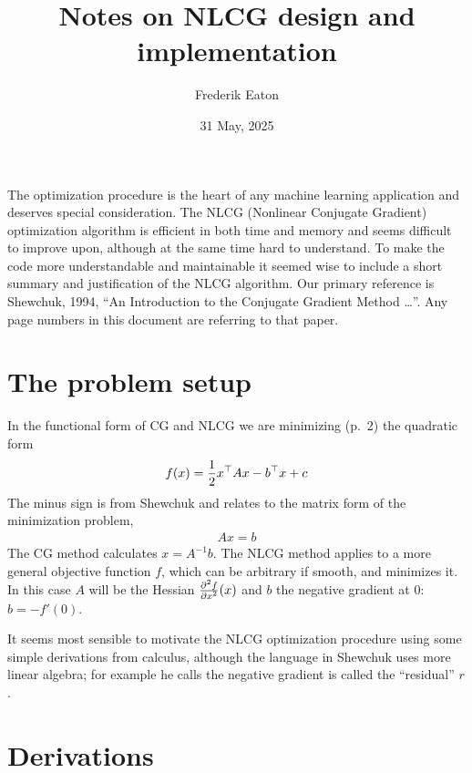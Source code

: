 \documentclass[11pt]{article}
\author{Frederik Eaton}
\date{31 May, 2025}
\title{Notes on NLCG design and implementation}
\newcommand{\T}{\top}
\renewcommand{\(}{\left(}
\renewcommand{\)}{\right)}
\newcommand{\partbyt}[2]{{\partial^2 #1\over {\partial #2}^2}}
\begin{document}
\maketitle

The optimization procedure is the heart of any machine learning
application and deserves special consideration. The NLCG (Nonlinear
Conjugate Gradient) optimization algorithm is efficient in both time
and memory and seems difficult to improve upon, although at the same
time hard to understand. To make the code more understandable and
maintainable it seemed wise to include a short summary and
justification of the NLCG algorithm. Our primary reference is
Shewchuk, 1994, ``An Introduction to the Conjugate Gradient Method
\ldots''. Any page numbers in this document are referring to that
paper.

\tableofcontents

\section{The problem setup}

In the functional form of CG and NLCG we are minimizing (p.~2) the
quadratic form
\begin{align}
f(x) = {1\over 2} x^\T A x - b^\T x + c
\end{align}
The minus sign is from Shewchuk and relates to the matrix form of the
minimization problem,
\begin{align}
Ax=b
\end{align}
The CG method calculates $x=A^{-1} b$. The NLCG method applies to a
more general objective function $f$, which can be arbitrary if smooth,
and minimizes it. In this case $A$ will be the Hessian
$\partbyt{f}{x}(x)$ and $b$ the negative gradient at 0: $b=-f'(0)$.

It seems most sensible to motivate the NLCG optimization procedure
using some simple derivations from calculus, although the language in
Shewchuk uses more linear algebra; for example he calls the negative
gradient is called the ``residual'' $r$.

\section{Derivations}

\newcommand{\deriv}[1]{
  \refstepcounter{deriv}
    \vspace{1em}
    \noindent\textbf{Derivation \thederiv: #1} \\
}
\end{document}
